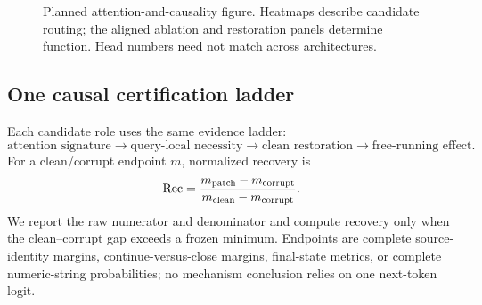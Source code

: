 \begin{figure}[H]
\centering
{}
\caption{Planned attention-and-causality figure. Heatmaps describe candidate routing; the aligned ablation and restoration panels determine function. Head numbers need not match across architectures.}
\label{fig:head-todo}
\end{figure}

\subsection{One causal certification ladder}

Each candidate role uses the same evidence ladder:
\begin{equation}
\text{attention signature}
\longrightarrow
\text{query-local necessity}
\longrightarrow
\text{clean restoration}
\longrightarrow
\text{free-running effect}.
\label{eq:head-ladder}
\end{equation}
For a clean/corrupt endpoint \(m\), normalized recovery is
\begin{equation}
\operatorname{Rec}
=
\frac{m_{\rm patch}-m_{\rm corrupt}}
{m_{\rm clean}-m_{\rm corrupt}}.
\label{eq:recovery}
\end{equation}
We report the raw numerator and denominator and compute recovery only when the clean--corrupt gap exceeds a frozen minimum. Endpoints are complete source-identity margins, continue-versus-close margins, final-state metrics, or complete numeric-string probabilities; no mechanism conclusion relies on one next-token logit.


